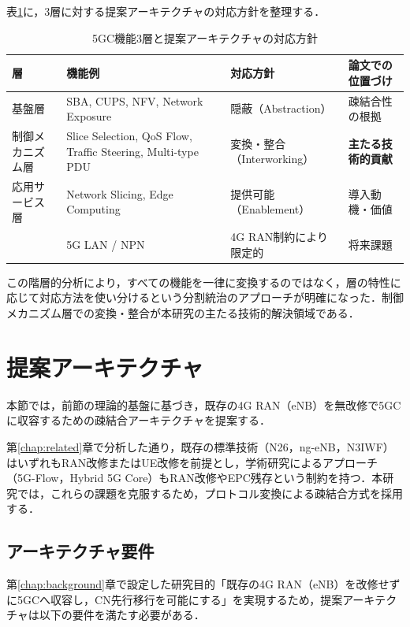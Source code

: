 表\ref{tab:3layer_strategy}に，3層に対する提案アーキテクチャの対応方針を整理する．

\begin{table}[htbp]
\centering
\caption{5GC機能3層と提案アーキテクチャの対応方針}
\label{tab:3layer_strategy}
\begin{tabular}{|p{2.2cm}|p{3.5cm}|p{3cm}|p{3.5cm}|}
\hline
\textbf{層} & \textbf{機能例} & \textbf{対応方針} & \textbf{論文での位置づけ} \\
\hline
基盤層 & SBA, CUPS, NFV, Network Exposure & 隠蔽（Abstraction） & 疎結合性の根拠 \\
\hline
制御メカニズム層 & Slice Selection, QoS Flow, Traffic Steering, Multi-type PDU & 変換・整合（Interworking） & \textbf{主たる技術的貢献} \\
\hline
応用サービス層 & Network Slicing, Edge Computing & 提供可能（Enablement） & 導入動機・価値 \\
\hline
& 5G LAN / NPN & 4G RAN制約により限定的 & 将来課題 \\
\hline
\end{tabular}
\end{table}

この階層的分析により，すべての機能を一律に変換するのではなく，層の特性に応じて対応方法を使い分けるという分割統治のアプローチが明確になった．制御メカニズム層での変換・整合が本研究の主たる技術的解決領域である．

\section{提案アーキテクチャ}
\label{sec:proposed_architecture}

本節では，前節の理論的基盤に基づき，既存の4G RAN（eNB）を無改修で5GCに収容するための疎結合アーキテクチャを提案する．

第\ref{chap:related}章で分析した通り，既存の標準技術（N26，ng-eNB，N3IWF）はいずれもRAN改修またはUE改修を前提とし，学術研究によるアプローチ（5G-Flow，Hybrid 5G Core）もRAN改修やEPC残存という制約を持つ．本研究では，これらの課題を克服するため，プロトコル変換による疎結合方式を採用する．

\subsection{アーキテクチャ要件}
\label{subsec:architecture_requirements}

第\ref{chap:background}章で設定した研究目的「既存の4G RAN（eNB）を改修せずに5GCへ収容し，CN先行移行を可能にする」を実現するため，提案アーキテクチャは以下の要件を満たす必要がある．

